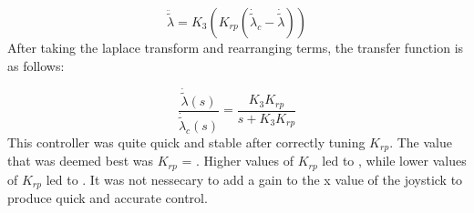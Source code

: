 \begin{equation}
\label{eq:p controller in travel EoM}
\ddot{\tilde{\lambda}} = K_3(K_{rp}(\dot{\tilde{\lambda}}_c -
\dot{\tilde{\lambda}}))
\end{equation}
After taking the laplace transform and rearranging terms, the transfer
function is as follows:

\begin{equation}
\label{eq:Transfer function between travel and desired travel}
\frac{\dot{\tilde{\lambda}}(s)}{\dot{\tilde{\lambda}}_c(s)} = \frac{K_3K_{rp}}{s + K_3K_{rp}}
\end{equation}
This controller was quite quick and stable after correctly tuning
$K_{rp}$. The value that was deemed best was $K_{rp}$ = . Higher values of $K_{rp}$ led to , while lower values of $K_{rp}$ led to .  It was not nessecary to add a gain to the x value of
the joystick to produce quick and accurate control.

